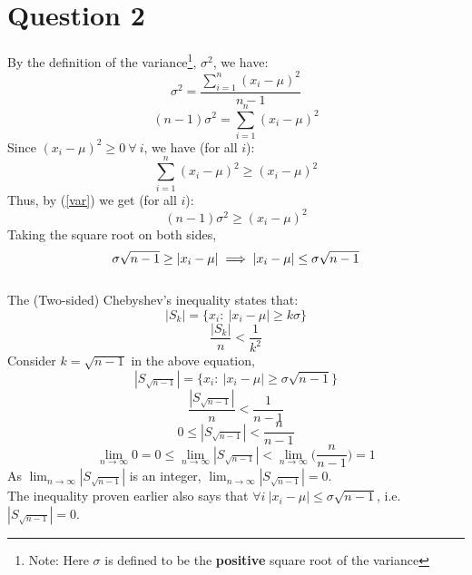 \documentclass[11pt]{article}
\begin{document}
\section*{Question 2}
\setcounter{equation}{0}
By the definition of the variance\footnote{Note: Here $\sigma$ is defined to be the \textbf{positive} square root of the variance}, $\sigma^2$, we have:
$$ \sigma^2 = \frac{\sum_{i=1}^n (x_i - \mu)^2}{n-1} $$
\begin{equation}
    \label{var}
    (n-1)\sigma^2 = \sum_{i=1}^n (x_i - \mu)^2
\end{equation}
Since $(x_i - \mu)^2 \ge 0 \  \forall \ i$, we have (for all $i$):
$$ \sum_{i=1}^n (x_i - \mu)^2 \ge (x_i - \mu)^2  $$
Thus, by (\ref{var}) we get (for all $i$):
$$ (n-1)\sigma^2 \ge (x_i - \mu)^2 $$
Taking the square root on both sides,
$$ \sigma\sqrt{n-1} \ge |x_i - \mu| \implies |x_i - \mu| \le \sigma\sqrt{n-1} \hfill $$
\hfill \qedsymbol \\
\noindent
The (Two-sided) Chebyshev's inequality states that:
$$ |S_k| = \{ x_i : \  |x_i - \mu| \ge k\sigma \} $$
\begin{equation}
    \frac{|S_k|}{n} < \frac{1}{k^2}
\end{equation}
Consider $k = \sqrt{n-1}$ in the above equation,\\
$$ |S_{\sqrt{n-1}}| = \{ x_i : \  |x_i - \mu| \ge \sigma\sqrt{n-1} \} $$
$$ \frac{|S_{\sqrt{n-1}}|}{n} < \frac{1}{n-1} $$
$$ 0 \leq |S_{\sqrt{n-1}}| < \frac{n}{n-1}$$
$$ \lim_{n\to\infty}0=0 \leq \lim_{n\to\infty}|S_{\sqrt{n-1}}| < \lim_{n\to\infty}\bigg( \frac{n}{n-1} \bigg)=1$$
As $\lim_{n\to\infty}|S_{\sqrt{n-1}}|$ is an integer, $\lim_{n\to\infty}|S_{\sqrt{n-1}}| = 0$. \\
The inequality proven earlier also says that $\forall i \ |x_i - \mu| \le \sigma \sqrt{n-1}$, i.e. $|S_{\sqrt{n-1}}| = 0$.\\



\newpage
\end{document}
